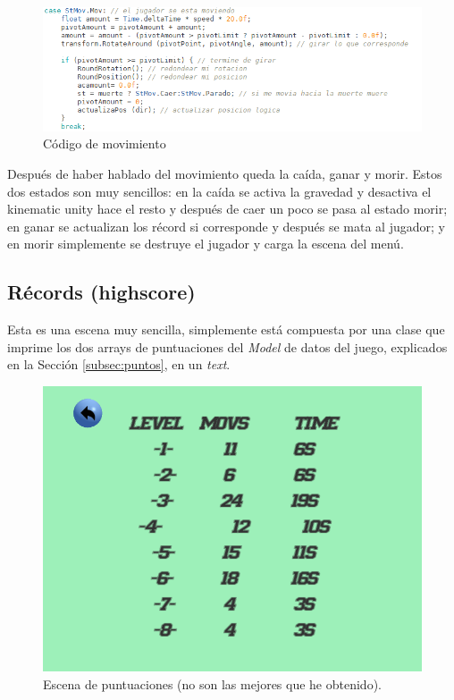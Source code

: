 \documentclass{article}
\begin{document}
\begin{figure}[h!]
\centering
\includegraphics[scale=.75]{mover.png}
\caption{Código de movimiento}
\label{fig:mover}
\end{figure}

Después de haber hablado del movimiento queda la caída, ganar y morir. Estos dos estados son muy sencillos: en la caída se activa la gravedad y desactiva el kinematic unity hace el resto y después de caer un poco se pasa al estado morir; en ganar se actualizan los récord si corresponde y después se mata al jugador; y en morir simplemente se destruye el jugador y carga la escena del menú.



\newpage
\subsection{Récords (highscore)}
Esta es una escena muy sencilla, simplemente está compuesta por una clase que imprime los dos arrays de puntuaciones del \emph{Model} de datos del juego, explicados en la Sección \ref{subsec:puntos}, en un \emph{text}.\\

\begin{figure}[h!]
\centering
\includegraphics[scale=.4]{highscore.png}
\caption{Escena de puntuaciones (no son las mejores que he obtenido).}
\label{fig:highscore}
\end{figure}
\end{document}
